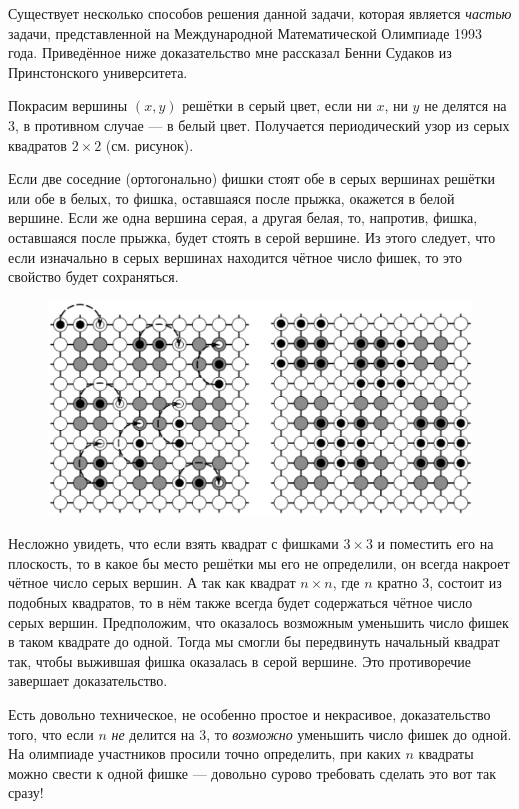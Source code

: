 Существует несколько способов решения данной задачи, которая является \emph{частью} задачи, представленной на Международной Математической Олимпиаде 1993 года.
Приведённое ниже доказательство мне рассказал Бенни Судаков из Принстонского университета.

\medskip

Покрасим вершины $(x, y)$ решётки в серый цвет, если ни $x$, ни $y$ не делятся на $3$, в противном случае --- в белый цвет.
Получается периодический узор из серых квадратов $2\times 2$ (см. рисунок). 

Если две соседние (ортогонально) фишки стоят обе в серых вершинах решётки или обе в белых, то фишка, оставшаяся после прыжка, окажется в белой вершине.
Если же одна вершина серая, а другая белая, то, напротив, фишка, оставшаяся после прыжка, будет стоять в серой вершине.
Из этого следует, что если изначально в серых вершинах находится чётное число фишек, то это свойство будет сохраняться.

\begin{figure}[h!]
\centering
\includegraphics[scale=0.5]{Figs/Algorithms/square}
\end{figure}

Несложно увидеть, что если взять квадрат с фишками $3\times 3$ и поместить его на плоскость, то в какое бы место решётки мы его не определили, он всегда накроет чётное число серых вершин.
А так как квадрат $n\times n$, где $n$ кратно $3$, состоит из подобных квадратов, то в нём также всегда будет содержаться чётное число серых вершин.
Предположим, что оказалось возможным уменьшить число фишек в таком квадрате до одной.
Тогда мы смогли бы передвинуть начальный квадрат так, чтобы выжившая фишка оказалась в серой вершине. 
Это противоречие завершает доказательство.
\heart

Есть довольно техническое, не особенно простое и некрасивое, 
доказательство того, что если $n$ \emph{не} делится на $3$, то \emph{возможно} уменьшить число фишек до одной.
На олимпиаде участников просили точно определить, при каких $n$ квадраты можно свести к одной фишке --- довольно сурово требовать сделать это вот так сразу!

